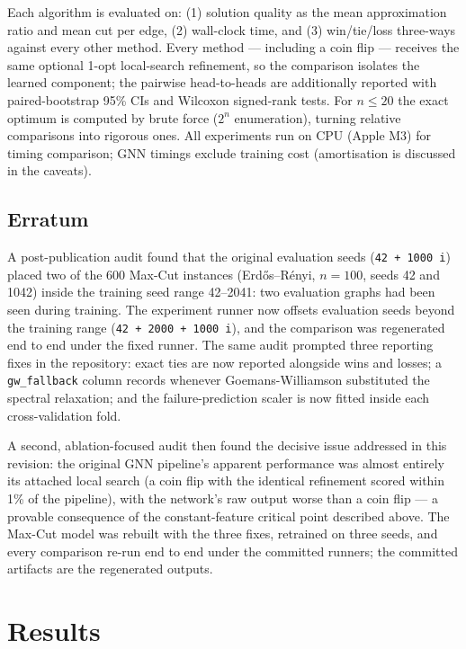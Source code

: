 \documentclass[11pt]{article}
\begin{document}
Each algorithm is evaluated on: (1) solution quality as the mean approximation ratio and mean cut per edge, (2) wall-clock time, and (3) win/tie/loss three-ways against every other method.
Every method --- including a coin flip --- receives the same optional 1-opt local-search refinement, so the comparison isolates the learned component; the pairwise head-to-heads are additionally reported with paired-bootstrap 95\% CIs and Wilcoxon signed-rank tests.
For $n \leq 20$ the exact optimum is computed by brute force ($2^n$ enumeration), turning relative comparisons into rigorous ones.
All experiments run on CPU (Apple M3) for timing comparison; GNN timings exclude training cost (amortisation is discussed in the caveats).

\subsection*{Erratum}

A post-publication audit found that the original evaluation seeds (\texttt{42 + 1000\,i}) placed two of the 600 Max-Cut instances (Erd\H{o}s--R\'enyi, $n{=}100$, seeds 42 and 1042) inside the training seed range 42--2041: two evaluation graphs had been seen during training. The experiment runner now offsets evaluation seeds beyond the training range (\texttt{42 + 2000 + 1000\,i}), and the comparison was regenerated end to end under the fixed runner. The same audit prompted three reporting fixes in the repository: exact ties are now reported alongside wins and losses; a \texttt{gw\_fallback} column records whenever Goemans-Williamson substituted the spectral relaxation; and the failure-prediction scaler is now fitted inside each cross-validation fold.

A second, ablation-focused audit then found the decisive issue addressed in this revision: the original GNN pipeline's apparent performance was almost entirely its attached local search (a coin flip with the identical refinement scored within 1\% of the pipeline), with the network's raw output worse than a coin flip --- a provable consequence of the constant-feature critical point described above. The Max-Cut model was rebuilt with the three fixes, retrained on three seeds, and every comparison re-run end to end under the committed runners; the committed artifacts are the regenerated outputs.

\section{Results}
\end{document}
